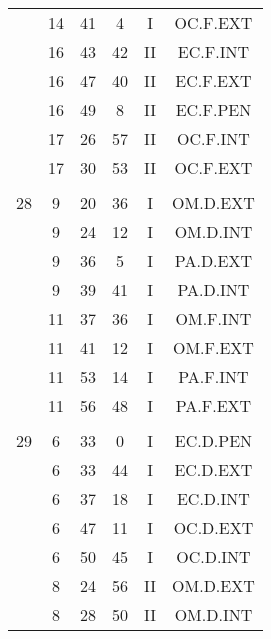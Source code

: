 \documentclass[12pt, a4paper]{article}
\begin{document}
\begin{multicols}{3}
{\begin{tabular}{c c c c c c}
	 	 	 	 & 14 & 41 & 4 & I & OC.F.EXT\\%
	 	 	 	 & 16 & 43 & 42 & II & EC.F.INT\\%
	 	 	 	 & 16 & 47 & 40 & II & EC.F.EXT\\%
	 	 	 	 & 16 & 49 & 8 & II & EC.F.PEN\\%
	 	 	 	 & 17 & 26 & 57 & II & OC.F.INT\\%
	 	 	 	 & 17 & 30 & 53 & II & OC.F.EXT\\%
	 	 	 	 & & & & & \\%
	 	 	 	28 & 9 & 20 & 36 & I & OM.D.EXT\\%
	 	 	 	 & 9 & 24 & 12 & I & OM.D.INT\\%
	 	 	 	 & 9 & 36 & 5 & I & PA.D.EXT\\%
	 	 	 	 & 9 & 39 & 41 & I & PA.D.INT\\%
	 	 	 	 & 11 & 37 & 36 & I & OM.F.INT\\%
	 	 	 	 & 11 & 41 & 12 & I & OM.F.EXT\\%
	 	 	 	 & 11 & 53 & 14 & I & PA.F.INT\\%
	 	 	 	 & 11 & 56 & 48 & I & PA.F.EXT\\%
	 	 	 	 & & & & & \\%
	 	 	 	29 & 6 & 33 & 0 & I & EC.D.PEN\\%
	 	 	 	 & 6 & 33 & 44 & I & EC.D.EXT\\%
	 	 	 	 & 6 & 37 & 18 & I & EC.D.INT\\%
	 	 	 	 & 6 & 47 & 11 & I & OC.D.EXT\\%
	 	 	 	 & 6 & 50 & 45 & I & OC.D.INT\\%
	 	 	 	 & 8 & 24 & 56 & II & OM.D.EXT\\%
	 	 	 	 & 8 & 28 & 50 & II & OM.D.INT\\%

\end{tabular}}
\end{multicols}
\end{document}
